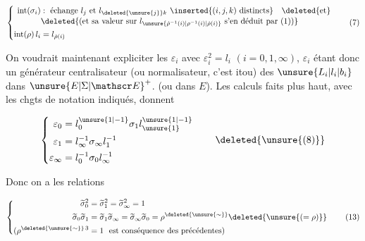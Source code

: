 \[
\left\{\begin{aligned}
\mathrm{int}(\sigma_i)&:\ \text{échange } l_j \text{ et }l_{\deleted{\unsure{j}}k}
 \ \inserted{(i,j,k)\ \text{distincts}}\quad\deleted{\text{et}}\\[-2pt]
&\deleted{\text{(et sa valeur sur }l_{\unsure{\dot\rho^{-1}(i)|\rho^{-1}(i)|\dot\rho(i)}}\text{ s'en déduit par (1))}}\\
\mathrm{int}(\rho)\,l_i&=l_{\dot\rho(i)}
\end{aligned}\right. \tag*{(7)}
\]

On voudrait maintenant expliciter les $\varepsilon_i$ avec $\varepsilon_i^2=l_i$ $(i=0,1,\infty)$, $\varepsilon_i$ étant donc un générateur  centralisateur (ou normalisateur, c'est itou) des $\unsure{L_i|l_i|b_i}$ dans ${\unsure{E|\Sigma|\mathscr E}}^+$. (ou  dans $E$). Les calculs faits plus haut, avec les chgts de notation indiqués, donnent

\[
\left\{\begin{aligned}
\varepsilon_0&=l_0^{\unsure{1|-1}}\sigma_1l_{\unsure{1}}^{\unsure{1|-1}}\\
\varepsilon_1&=l_\infty^{-1}\sigma_\infty l_1^{-1}\\
\varepsilon_\infty&=l_0^{-1}\sigma_0 l_\infty^{-1}
\end{aligned}\right. \tag*{\deleted{\unsure{(8)}}}
\]

Donc on a les relations

\[
\left\{\begin{aligned}
\widetilde\sigma_0^2&=\widetilde\sigma_1^2=\widetilde\sigma_\infty^2=1\\
\widetilde\sigma_0\widetilde\sigma_1&=\widetilde\sigma_1\widetilde\sigma_\infty=\widetilde\sigma_\infty\widetilde\sigma_0=\rho^{\deleted{\unsure{\sim}}}\deleted{\unsure{(=\rho)}}\\
(\rho^{\deleted{\unsure{\sim}}\,3}&=1\ \text{ est conséquence des précédentes})
\end{aligned}\right. \tag*{(13)}
\]


